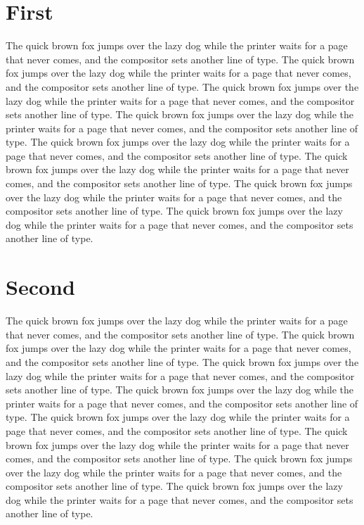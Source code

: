 \documentclass[10pt,twocolumn]{article}
\begin{document}
\section{First}
The quick brown fox jumps over the lazy dog while the printer waits for a
page that never comes, and the compositor sets another line of type.
The quick brown fox jumps over the lazy dog while the printer waits for a
page that never comes, and the compositor sets another line of type.
The quick brown fox jumps over the lazy dog while the printer waits for a
page that never comes, and the compositor sets another line of type.
The quick brown fox jumps over the lazy dog while the printer waits for a
page that never comes, and the compositor sets another line of type.
The quick brown fox jumps over the lazy dog while the printer waits for a
page that never comes, and the compositor sets another line of type.
The quick brown fox jumps over the lazy dog while the printer waits for a
page that never comes, and the compositor sets another line of type.
The quick brown fox jumps over the lazy dog while the printer waits for a
page that never comes, and the compositor sets another line of type.
The quick brown fox jumps over the lazy dog while the printer waits for a
page that never comes, and the compositor sets another line of type.

\section{Second}
The quick brown fox jumps over the lazy dog while the printer waits for a
page that never comes, and the compositor sets another line of type.
The quick brown fox jumps over the lazy dog while the printer waits for a
page that never comes, and the compositor sets another line of type.
The quick brown fox jumps over the lazy dog while the printer waits for a
page that never comes, and the compositor sets another line of type.
The quick brown fox jumps over the lazy dog while the printer waits for a
page that never comes, and the compositor sets another line of type.
The quick brown fox jumps over the lazy dog while the printer waits for a
page that never comes, and the compositor sets another line of type.
The quick brown fox jumps over the lazy dog while the printer waits for a
page that never comes, and the compositor sets another line of type.
The quick brown fox jumps over the lazy dog while the printer waits for a
page that never comes, and the compositor sets another line of type.
The quick brown fox jumps over the lazy dog while the printer waits for a
page that never comes, and the compositor sets another line of type.
\end{document}
